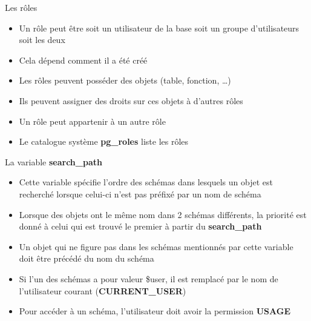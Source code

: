 
\begin{frame}[fragile]{Les rôles}

   \begin{itemize}
      \item Un rôle peut être soit un utilisateur de la base soit un groupe d'utilisateurs soit les deux
      \item Cela dépend comment il a été créé
      \item Les rôles peuvent posséder des objets (table, fonction, \ldots)
      \item Ils peuvent assigner des droits sur ces objets à d'autres rôles
      \item Un rôle peut appartenir à un autre rôle
      \item Le catalogue système \textbf{pg\_roles} liste les rôles
   \end{itemize}

\begin{toile}
\end{toile}

\end{frame}


\begin{frame}[fragile]{La variable \textbf{search\_path}}

   \begin{itemize}
      \item Cette variable spécifie l'ordre des schémas dans lesquels un objet est recherché lorsque celui-ci n'est pas préfixé par un nom de schéma
      \item Lorsque des objets ont le même nom dans 2 schémas différents, la priorité est donné à celui qui est trouvé le premier à partir du \textbf{search\_path}
      \item Un objet qui ne figure pas dans les schémas mentionnés par cette variable doit être précédé du nom du schéma
      \item Si l'un des schémas a pour valeur \$user, il est remplacé par le nom de l'utilisateur courant (\textbf{CURRENT\_USER})
      \item Pour accéder à un schéma, l'utilisateur doit avoir la permission \textbf{USAGE}
   \end{itemize}

\begin{toile}
\end{toile}

\end{frame}

